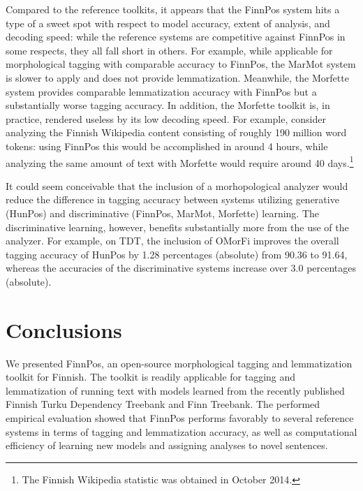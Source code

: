 \documentclass[smallextended]{svjour3}       %
\begin{document}
Compared to the reference toolkits, it appears that the FinnPos system hits a type of a sweet spot with respect to model accuracy, extent of analysis, and decoding speed: while the reference systems are competitive against FinnPos in some respects, they all fall short in others. For example, while applicable for morphological tagging with comparable accuracy to FinnPos, the MarMot system is slower to apply and does not provide lemmatization. Meanwhile, the Morfette system provides comparable lemmatization accuracy with FinnPos but a substantially worse tagging accuracy. In addition, the Morfette toolkit is, in practice, rendered useless by its low decoding speed. For example, consider analyzing the Finnish Wikipedia content consisting of roughly 190 million word tokens: using FinnPos this would be accomplished in around 4 hours, while analyzing the same amount of text with Morfette would require around 40 days.\footnote{The Finnish Wikipedia statistic was obtained in October 2014.}

It could seem conceivable that the inclusion of a morhopological analyzer would reduce the difference in tagging accuracy between systems utilizing generative (HunPos) and discriminative (FinnPos, MarMot, Morfette) learning. The discriminative learning, however, benefits substantially more from the use of the analyzer. For example, on TDT, the inclusion of OMorFi improves the overall tagging accuracy of HunPos by 1.28 percentages (absolute) from 90.36 to 91.64, whereas the accuracies of the discriminative systems increase over 3.0 percentages (absolute). 


\section{Conclusions}
\label{sec: conclusions}

We presented FinnPos, an open-source morphological tagging and lemmatization toolkit for Finnish. The toolkit is readily applicable for tagging and lemmatization of running text with models learned from the recently published Finnish Turku Dependency Treebank and Finn Treebank. The performed empirical evaluation showed that FinnPos performs favorably to several reference systems in terms of tagging and lemmatization accuracy, as well as computational efficiency of learning new models and assigning analyses to novel sentences. 
\end{document}
